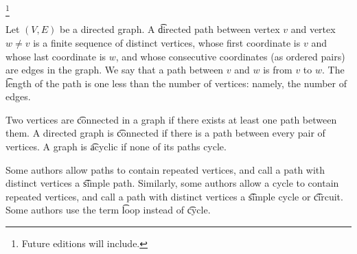 
\footnote{Future editions will include.}


Let $(V, E)$ be a directed graph.
A \t{directed path} between vertex $v$ and vertex $w \neq v$ is a finite sequence of distinct vertices, whose first coordinate is $v$ and whose last coordinate is $w$, and whose consecutive coordinates (as ordered pairs) are edges in the graph.
We say that a path between $v$ and $w$ is from $v$ to $w$.
The \t{length} of the path is one less than the number of vertices: namely, the number of edges.

Two vertices are \t{connected} in a graph if there exists at least one path between them.
A directed graph is \t{connected} if there is a path between every pair of vertices.
A graph is \t{acyclic} if none of its paths cycle.


Some authors allow paths to contain repeated vertices, and call a path with distinct vertices a \t{simple path}.
Similarly, some authors allow a cycle to contain repeated vertices, and call a path with distinct vertices a \t{simple cycle} or \t{circuit}.
Some authors use the term \t{loop} instead of \t{cycle}.

\blankpage
